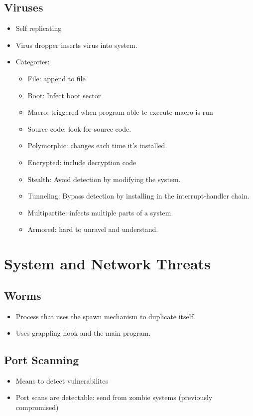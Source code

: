 \documentclass[10pt]{report}
\begin{document}
		\subsection{Viruses}
			\begin{itemize}
				\item Self replicating
				\item Virus dropper inserts virus into system.
				\item Categories:
				\begin{itemize}
					\item File: append to file
					\item Boot: Infect boot sector
					\item Macro: triggered when program able te execute macro is run
					\item Source code: look for source code.
					\item Polymorphic: changes each time it's installed.
					\item Encrypted: include decryption code
					\item Stealth: Avoid detection by modifying the system.
					\item Tunneling: Bypass detection by installing in the interrupt-handler chain.
					\item Multipartite: infects multiple parts of a system.
					\item Armored: hard to unravel and understand.
				\end{itemize}
			\end{itemize}

	\section{System and Network Threats}
		\subsection{Worms}
			\begin{itemize}
				\item Process that uses the spawn mechanism to duplicate itself.
				\item Uses grappling hook and the main program.
			\end{itemize}

		\subsection{Port Scanning}
			\begin{itemize}
				\item Means to detect vulnerabilites
				\item Port scans are detectable: send from zombie systems (previously compromised)
			\end{itemize}
\end{document}
